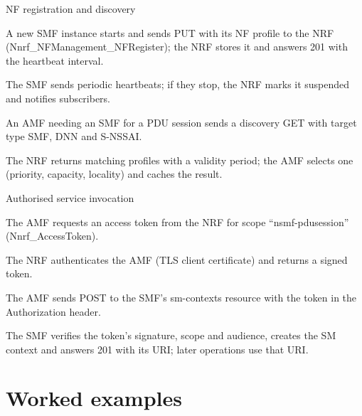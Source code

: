 \documentclass[11pt,a4paper]{article}
\begin{document}
\begin{procedurebox}{NF registration and discovery}\label{proc:register}
\begin{steps}
  \item A new SMF instance starts and sends PUT with its NF profile to the NRF (Nnrf\_NFManagement\_NFRegister); the NRF stores it
        and answers 201 with the heartbeat interval.
  \item The SMF sends periodic heartbeats; if they stop, the NRF marks it suspended and notifies subscribers.
  \item An AMF needing an SMF for a PDU session sends a discovery GET with target type SMF, DNN and S-NSSAI.
  \item The NRF returns matching profiles with a validity period; the AMF selects one (priority, capacity, locality) and caches the
        result.
\end{steps}
\end{procedurebox}

\begin{procedurebox}{Authorised service invocation}\label{proc:invoke}
\begin{steps}
  \item The AMF requests an access token from the NRF for scope ``nsmf-pdusession'' (Nnrf\_AccessToken).
  \item The NRF authenticates the AMF (TLS client certificate) and returns a signed token.
  \item The AMF sends POST to the SMF's sm-contexts resource with the token in the Authorization header.
  \item The SMF verifies the token's signature, scope and audience, creates the SM context and answers 201 with its URI; later
        operations use that URI.
\end{steps}
\end{procedurebox}

\begin{acnfigure}
  \caption{Registration, discovery, token and service invocation (\cref{proc:register,proc:invoke}).}
  \label{fig:nrf}
\end{acnfigure}

\section{Worked examples}
\end{document}
